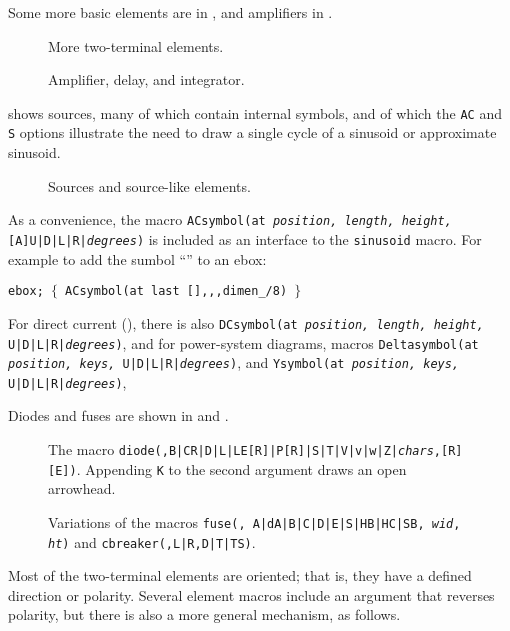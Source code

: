 Some more basic elements are in , and amplifiers in .
\begin{figure}[h!t]
   
   \caption{More two-terminal elements.}
   \label{MoreTable}
    \end{figure}
\begin{figure}[h!t]
   
   \caption{Amplifier, delay, and integrator.}
   \label{AmpTable}
   \end{figure}

 shows sources, many of which contain internal symbols,
and of which the {\tt AC} and {\tt S} options illustrate the need
to draw a single cycle of a sinusoid or approximate sinusoid.
\begin{figure}[h!t]
   
   \caption{Sources and source-like elements.}
   \label{Sources}
   \end{figure}
As a convenience,
the macro {\tt ACsymbol(at {\sl position, length, height,}
  [A]U|D|L|R|{\sl degrees})} is included as an interface to
the {\tt sinusoid} macro.  For example to add the sumbol
``'' to an ebox:
\par
{\tt ebox; $\lbrace$\ ACsymbol(at last [],{,},dimen\_/8) $\rbrace$}

\noindent
For direct current (), there is also
{\tt DCsymbol(at {\sl position, length, height,} U|D|L|R|{\sl degrees})},
and for power-system diagrams, macros
{\tt Deltasymbol(at {\sl position, keys,} U|D|L|R|{\sl degrees})},
and
{\tt Ysymbol(at {\sl position, keys,} U|D|L|R|{\sl degrees})},

\pagebreak
Diodes and fuses are shown in  and .
\begin{figure}[h!]
   
   \caption{The macro
     {\tt diode(\linespec,B|CR|D|L|LE[R]|P[R]|S|T|V|v|w|Z|{\sl chars},[R][E])}.
      Appending {\tt K} to the second argument draws an open arrowhead.}
   \label{Diodes}
   \end{figure}
\begin{figure}[h!]
   
   \caption{Variations of the macros
     {\tt fuse(\linespec, A|dA|B|C|D|E|S|HB|HC|SB, {\sl wid}, {\sl ht})}
     and {\tt cbreaker(\linespec,L|R,D|T|TS)}.}
   \label{Fuses}
   \end{figure}

\enlargethispage{\baselineskip}%
Most of the two-terminal elements are oriented; that is, they have
a defined direction or polarity.  Several element macros include an
argument that reverses polarity, but there is also a more general
mechanism, as follows.

